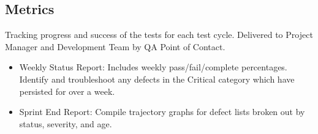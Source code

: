 \documentclass[letterpaper,10pt,english,openany,oneside]{sphinxmanual}
\begin{document}
\subsection{Metrics}
\label{\detokenize{test_plan/issue_management:metrics}}
Tracking progress and success of the tests for each test cycle. Delivered to Project Manager and Development Team by QA Point of Contact.
\begin{itemize}
\item {} 
Weekly Status Report: Includes weekly pass/fail/complete percentages. Identify and troubleshoot any defects in the Critical category which have persisted for over a week.

\item {} 
Sprint End Report: Compile trajectory graphs for defect lists broken out by status, severity, and age.

\end{itemize}
\end{document}
